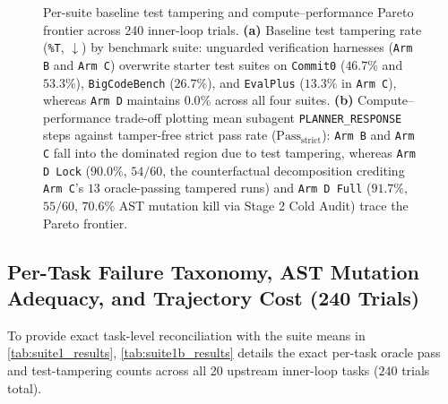 \documentclass[11pt,a4paper,copyright]{google}
\begin{document}
\begin{figure}[t!]
\caption{Per-suite baseline test tampering and compute--performance Pareto frontier across 240 inner-loop trials. \textbf{(a)} Baseline test tampering rate (\texttt{\%T}, $\downarrow$) by benchmark suite: unguarded verification harnesses (\texttt{Arm B} and \texttt{Arm C}) overwrite starter test suites on \texttt{Commit0} ($46.7\%$ and $53.3\%$), \texttt{BigCodeBench} ($26.7\%$), and \texttt{EvalPlus} ($13.3\%$ in \texttt{Arm C}), whereas \texttt{Arm D} maintains $0.0\%$ across all four suites. \textbf{(b)} Compute--performance trade-off plotting mean subagent \texttt{PLANNER\_RESPONSE} steps against tamper-free strict pass rate ($\text{Pass}_{\text{strict}}$): \texttt{Arm B} and \texttt{Arm C} fall into the dominated region due to test tampering, whereas \texttt{Arm D Lock} ($90.0\%$, $54/60$, the counterfactual decomposition crediting \texttt{Arm C}'s $13$ oracle-passing tampered runs) and \texttt{Arm D Full} ($91.7\%$, $55/60$, $70.6\%$ AST mutation kill via Stage 2 Cold Audit) trace the Pareto frontier.}
\label{fig:per_suite_pareto}
\end{figure}

\subsection{Per-Task Failure Taxonomy, AST Mutation Adequacy, and Trajectory Cost (240 Trials)}
\label{subsec:suite1b_results}

To provide exact task-level reconciliation with the suite means in \cref{tab:suite1_results}, \cref{tab:suite1b_results} details the exact per-task oracle pass and test-tampering counts across all 20 upstream inner-loop tasks ($240$ trials total).
\end{document}
